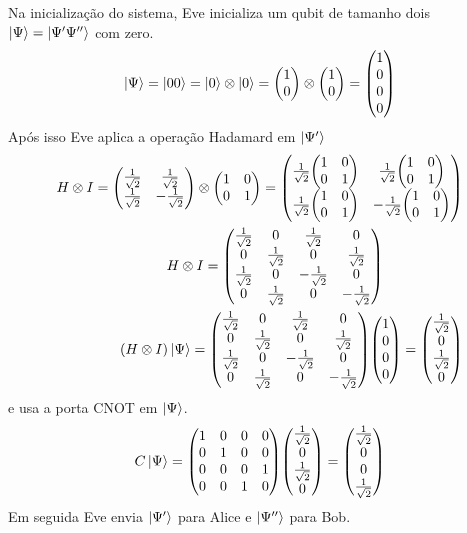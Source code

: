 \documentclass[a4paper, 12pt, oneside]{book}
\begin{document}
Na inicialização do sistema, Eve inicializa um qubit de tamanho dois $\ket{\Psi}=\ket{\Psi' \Psi''}$ com zero. 
\begin{align*}
\ket{\Psi} = \ket{00} = \ket{0}\otimes \ket{0} = \mqty(1\\0) \otimes \mqty(1\\0) = \mqty(1\\0\\0\\0)
\end{align*}
Após isso Eve aplica a operação Hadamard em $\ket{\Psi'}$
\begin{align*}
H \otimes I = \mqty(\frac{1}{\sqrt{2}}&\frac{1}{\sqrt{2}}\\
				\frac{1}{\sqrt{2}}&-\frac{1}{\sqrt{2}} ) 
	\otimes \mqty(1&0\\0&1) 
= \mqty(\frac{1}{\sqrt{2}}\mqty(1&0\\0&1) & \frac{1}{\sqrt{2}}\mqty(1&0\\0&1) \\ 
	\frac{1}{\sqrt{2}}\mqty(1&0\\0&1) & -\frac{1}{\sqrt{2}}\mqty(1&0\\0&1))
	\\
H \otimes I = 
\mqty(\frac{1}{\sqrt{2}}&0&\frac{1}{\sqrt{2}}&0\\
	0&\frac{1}{\sqrt{2}}&0&\frac{1}{\sqrt{2}} \\
	\frac{1}{\sqrt{2}}&0&-\frac{1}{\sqrt{2}}&0 \\
	0&\frac{1}{\sqrt{2}}&0&-\frac{1}{\sqrt{2}}) \hspace{2cm} \\
(H \otimes I)\ket{\Psi} =  \mqty(\frac{1}{\sqrt{2}}&0&\frac{1}{\sqrt{2}}&0\\
	0&\frac{1}{\sqrt{2}}&0&\frac{1}{\sqrt{2}} \\
	\frac{1}{\sqrt{2}}&0&-\frac{1}{\sqrt{2}}&0 \\
	0&\frac{1}{\sqrt{2}}&0&-\frac{1}{\sqrt{2}}) 
	\mqty(1\\0\\0\\0) = \mqty(\frac{1}{\sqrt{2}}\\0\\ \frac{1}{\sqrt{2}}\\0)
\end{align*}
e usa a porta CNOT em $\ket{\Psi}$.
\begin{align*}
C\ket{\Psi} = \mqty(1&0&0&0\\0&1&0&0\\0&0&0&1\\0&0&1&0) 
			\mqty(\frac{1}{\sqrt{2}}\\0\\ \frac{1}{\sqrt{2}}\\0)
		= \mqty(\frac{1}{\sqrt{2}}\\0\\ 0\\ \frac{1}{\sqrt{2}})
\end{align*}
Em seguida Eve envia $\ket{\Psi'}$ para Alice e $\ket{\Psi''}$ para Bob. 
\end{document}
